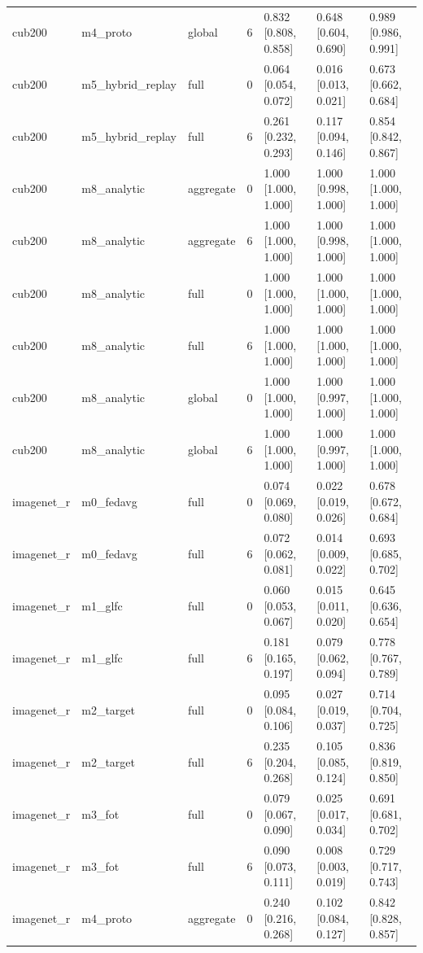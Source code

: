 \begin{tabular}{lllrlll}
cub200 & m4\_proto & global & 6 & 0.832 [0.808, 0.858] & 0.648 [0.604, 0.690] & 0.989 [0.986, 0.991] \\
cub200 & m5\_hybrid\_replay & full & 0 & 0.064 [0.054, 0.072] & 0.016 [0.013, 0.021] & 0.673 [0.662, 0.684] \\
cub200 & m5\_hybrid\_replay & full & 6 & 0.261 [0.232, 0.293] & 0.117 [0.094, 0.146] & 0.854 [0.842, 0.867] \\
cub200 & m8\_analytic & aggregate & 0 & 1.000 [1.000, 1.000] & 1.000 [0.998, 1.000] & 1.000 [1.000, 1.000] \\
cub200 & m8\_analytic & aggregate & 6 & 1.000 [1.000, 1.000] & 1.000 [0.998, 1.000] & 1.000 [1.000, 1.000] \\
cub200 & m8\_analytic & full & 0 & 1.000 [1.000, 1.000] & 1.000 [1.000, 1.000] & 1.000 [1.000, 1.000] \\
cub200 & m8\_analytic & full & 6 & 1.000 [1.000, 1.000] & 1.000 [1.000, 1.000] & 1.000 [1.000, 1.000] \\
cub200 & m8\_analytic & global & 0 & 1.000 [1.000, 1.000] & 1.000 [0.997, 1.000] & 1.000 [1.000, 1.000] \\
cub200 & m8\_analytic & global & 6 & 1.000 [1.000, 1.000] & 1.000 [0.997, 1.000] & 1.000 [1.000, 1.000] \\
imagenet\_r & m0\_fedavg & full & 0 & 0.074 [0.069, 0.080] & 0.022 [0.019, 0.026] & 0.678 [0.672, 0.684] \\
imagenet\_r & m0\_fedavg & full & 6 & 0.072 [0.062, 0.081] & 0.014 [0.009, 0.022] & 0.693 [0.685, 0.702] \\
imagenet\_r & m1\_glfc & full & 0 & 0.060 [0.053, 0.067] & 0.015 [0.011, 0.020] & 0.645 [0.636, 0.654] \\
imagenet\_r & m1\_glfc & full & 6 & 0.181 [0.165, 0.197] & 0.079 [0.062, 0.094] & 0.778 [0.767, 0.789] \\
imagenet\_r & m2\_target & full & 0 & 0.095 [0.084, 0.106] & 0.027 [0.019, 0.037] & 0.714 [0.704, 0.725] \\
imagenet\_r & m2\_target & full & 6 & 0.235 [0.204, 0.268] & 0.105 [0.085, 0.124] & 0.836 [0.819, 0.850] \\
imagenet\_r & m3\_fot & full & 0 & 0.079 [0.067, 0.090] & 0.025 [0.017, 0.034] & 0.691 [0.681, 0.702] \\
imagenet\_r & m3\_fot & full & 6 & 0.090 [0.073, 0.111] & 0.008 [0.003, 0.019] & 0.729 [0.717, 0.743] \\
imagenet\_r & m4\_proto & aggregate & 0 & 0.240 [0.216, 0.268] & 0.102 [0.084, 0.127] & 0.842 [0.828, 0.857] \\

\end{tabular}
